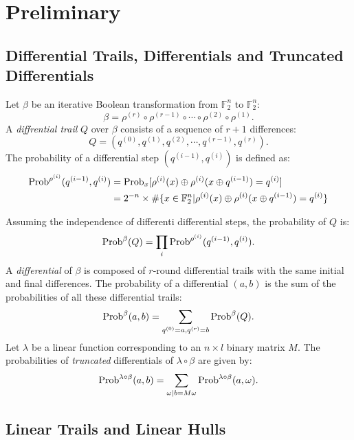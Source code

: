 \section{Preliminary\label{sec:pre}}

\subsection{Differential Trails, Differentials and Truncated Differentials}

Let $\beta$ be an iterative Boolean transformation from $\mathbb{F}_2^n$ to $\mathbb{F}_2^n$: 
\[
    \beta=\rho^{(r)}\circ\rho^{(r-1)}\circ\cdots\circ\rho^{(2)}\circ\rho^{(1)}.
\]
A \textit{diffrential trail} $Q$ over $\beta$ consists of a sequence of $r+1$ differences:
\[
    Q=(q^{(0)},q^{(1)},q^{(2)},\cdots,q^{(r-1)},q^{(r)}).
\]
The probability of a differential step $(q^{(i-1)},q^{(i)})$ is defined as:
\begin{align*}
    \text{Prob}^{\rho^{(i)}}(q^{(i-1)},q^{(i)})&=\text{Prob}_x[\rho^{(i)}(x)\oplus\rho^{(i)}(x\oplus q^{(i-1)})=q^{(i)}]\\
    &=2^{-n}\times\#\{x\in \mathbb{F}_2^n|\rho^{(i)}(x)\oplus\rho^{(i)}(x\oplus q^{(i-1)})=q^{(i)}\}
\end{align*}
    
Assuming the independence of differenti differential steps, the probability of $Q$ is:
\[
    \text{Prob}^{\beta}(Q)=\prod\limits_i\text{Prob}^{\rho^{(i)}}(q^{(i-1)},q^{(i)}).
\]
A \textit{differential} of $\beta$ is composed of $r$-round differential trails with the same initial and final differences. The probability of a differential $(a,b)$ is the sum of the probabilities of all these differential trails:
\[
    \text{Prob}^{\beta}(a,b)=\sum\limits_{q^{(0)}=a,q^{(r)}=b}\text{Prob}^{\beta}(Q).
\]
Let $\lambda$ be a linear function corresponding to an $n\times l$ binary matrix $M$. The probabilities of \textit{truncated} differentials of $\lambda\circ\beta$ are given by:
\[
    \text{Prob}^{\lambda\circ\beta}(a,b)=\sum\limits_{\omega|b=M\omega}\text{Prob}^{\lambda\circ\beta}(a,\omega).
\]

\subsection{Linear Trails and Linear Hulls}

